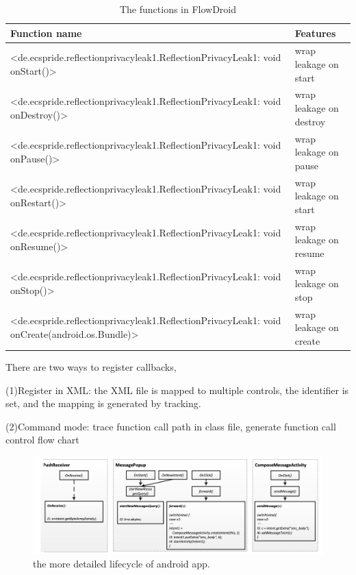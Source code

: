 \documentclass{article}
\begin{document}
\begin{table}
  \caption{The functions in FlowDroid}
   \centering
   \begin{tabular}{ll}
     \toprule
       Function name  & Features \\
     \midrule
          
<de.ecspride.reflectionprivacyleak1.ReflectionPrivacyLeak1: void onStart()>& wrap leakage on start\\

<de.ecspride.reflectionprivacyleak1.ReflectionPrivacyLeak1: void onDestroy()> & wrap leakage on destroy\\

<de.ecspride.reflectionprivacyleak1.ReflectionPrivacyLeak1: void onPause()>& wrap leakage on pause\\

<de.ecspride.reflectionprivacyleak1.ReflectionPrivacyLeak1: void onRestart()>& wrap leakage on start\\

<de.ecspride.reflectionprivacyleak1.ReflectionPrivacyLeak1: void onResume()>& wrap leakage on resume\\

<de.ecspride.reflectionprivacyleak1.ReflectionPrivacyLeak1: void onStop()>& wrap leakage on stop\\

<de.ecspride.reflectionprivacyleak1.ReflectionPrivacyLeak1: void onCreate(android.os.Bundle)>&wrap leakage on create \\
     \bottomrule
   \end{tabular}
   
   \label{tab:table1}
 \end{table}

There are two ways to register callbacks,

(1)Register in XML: the XML file is mapped to multiple controls, the identifier is set, and the mapping is generated by tracking.

(2)Command mode: trace function call path in class file, generate function call control flow chart


\begin{figure}[ht]
  \centering
  \includegraphics[scale=0.4]{FlowDroid4.png}
  \caption{the more detailed lifecycle of android app.}
  \label{fig:FlowDroid4}
\end{figure}
\end{document}
